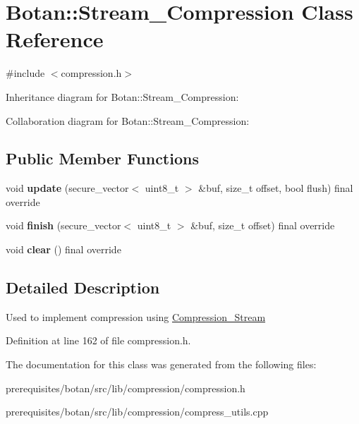 \hypertarget{class_botan_1_1_stream___compression}{}\section{Botan\+:\+:Stream\+\_\+\+Compression Class Reference}
\label{class_botan_1_1_stream___compression}


{\ttfamily \#include $<$compression.\+h$>$}



Inheritance diagram for Botan\+:\+:Stream\+\_\+\+Compression\+:


Collaboration diagram for Botan\+:\+:Stream\+\_\+\+Compression\+:
\subsection*{Public Member Functions}
\begin{DoxyCompactItemize}
\item 
\mbox{\label{class_botan_1_1_stream___compression_ae8bb7350605b27d81da8735ade9ab9df}} 
void {\bfseries update} (secure\+\_\+vector$<$ uint8\+\_\+t $>$ \&buf, size\+\_\+t offset, bool flush) final override
\item 
\mbox{\label{class_botan_1_1_stream___compression_a2203a1833a7f338e0bfb358b94a2b908}} 
void {\bfseries finish} (secure\+\_\+vector$<$ uint8\+\_\+t $>$ \&buf, size\+\_\+t offset) final override
\item 
\mbox{\label{class_botan_1_1_stream___compression_a70726b84346c1cc274c3ba567281b808}} 
void {\bfseries clear} () final override
\end{DoxyCompactItemize}


\subsection{Detailed Description}
Used to implement compression using \mbox{\hyperlink{class_botan_1_1_compression___stream}{Compression\+\_\+\+Stream}} 

Definition at line 162 of file compression.\+h.



The documentation for this class was generated from the following files\+:\begin{DoxyCompactItemize}
\item 
prerequisites/botan/src/lib/compression/compression.\+h\item 
prerequisites/botan/src/lib/compression/compress\+\_\+utils.\+cpp\end{DoxyCompactItemize}
